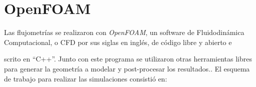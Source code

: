 





%


\section{OpenFOAM}\label{sec:3_openfoam}
%
Las flujometrías se realizaron con \emph{OpenFOAM}, un software de
Fluidodinámica Computacional, o CFD por sus siglas en inglés, de código libre y
abierto e

scrito en ``C++''.
%
%
Junto con este programa se utilizaron otras herramientas libres para generar la
geometría a modelar y post-procesar los resultados..
%
El esquema de trabajo para realizar las simulaciones consistió en:

